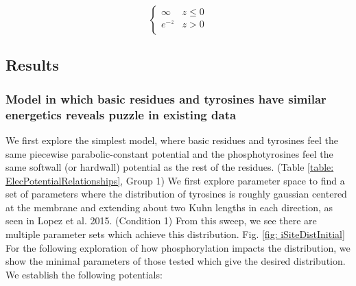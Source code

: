 \documentclass[../../AdvancementSummary.tex]{subfiles}
\begin{document}
\begin{equation}\label{eq: exponential}
\begin{cases}
\infty	& z \leq 0\\
e^{-z} & z > 0 \\
\end{cases}
\end{equation}


\subsection{Results}
\subsubsection{Model in which basic residues and tyrosines have similar energetics reveals puzzle in existing data}

We first explore the simplest model, where basic residues and tyrosines feel the same piecewise parabolic-constant potential and the phosphotyrosines feel the same softwall (or hardwall) potential as the rest of the residues. (Table \ref{table: ElecPotentialRelationships}, Group 1) We first explore parameter space to find a set of parameters where the distribution of tyrosines is roughly gaussian centered at the membrane and extending about two Kuhn lengths in each direction, as seen in Lopez et al. 2015. (Condition 1) From this sweep, we see there are multiple parameter sets which achieve this distribution.  Fig. \ref{fig: iSiteDistInitial} For the following exploration of how phosphorylation impacts the distribution, we show the minimal parameters of those tested which give the desired distribution. We establish the following potentials:
\end{document}
